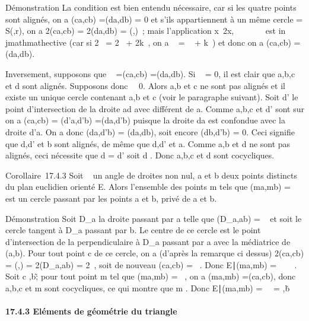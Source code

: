 \documentclass[]{article}
\begin{document}
Démonstration La condition est bien entendu nécessaire, car si les
quatre points sont alignés, on a \widehat(ca,cb)
=\widehat (da,db) = 0 et s'ils appartiennent à un
même cercle \Gamma = S(\omega,r), on a 2\widehat(ca,cb) =
2\widehat(da,db) =\widehat
(\overrightarrow\omegaa,\overrightarrow\omegab)~;
mais l'application x\mapsto~2x, ~\diagup\pi~ \rightarrow~ ~\pi~ est
in\\jmathmathective (car si 2\alpha~ = 2\beta~ + 2k\pi~, on a \alpha~ = \beta~ + k\pi~) et donc on a
\widehat(ca,cb) =\widehat (da,db).

Inversement, supposons que \alpha~ =\widehat (ca,cb)
=\widehat (da,db). Si \alpha~ = 0, il est clair que a,b,c
et d sont alignés. Supposons donc \alpha~\neq~0. Alors
a,b et c ne sont pas alignés et il existe un unique cercle \Gamma contenant
a,b et c (voir le paragraphe suivant). Soit d' le point d'intersection
de la droite ad avec \Gamma différent de a. Comme a,b,c et d' sont sur \Gamma on a
\widehat(ca,cb) =\widehat
(d'a,d'b) =\widehat (da,d'b) puisque la droite da
est confondue avec la droite d'a. On a donc
\widehat(da,d'b) =\widehat
(da,db), soit encore \widehat(db,d'b) = 0. Ceci
signifie que d,d' et b sont alignés, de même que d,d' et a. Comme a,b et
d ne sont pas alignés, ceci nécessite que d = d' soit d \in \Gamma. Donc a,b,c
et d sont cocycliques.

Corollaire~17.4.3 Soit \alpha~ un angle de droites non nul, a et b deux points
distincts du plan euclidien orienté E. Alors l'ensemble des points m
tels que \widehat(ma,mb) = \alpha~ est un cercle passant
par les points a et b, privé de a et b.

Démonstration Soit D_a la droite passant par a telle que
\widehat(D_a,ab) = \alpha~ et soit \Gamma le cercle
tangent à D_a passant par b. Le centre \omega de ce cercle est le
point d'intersection de la perpendiculaire à D_a passant par a
avec la médiatrice de (a,b). Pour tout point c de ce cercle, on a
(d'après la remarque ci dessus) 2\widehat(ca,cb)
=\widehat
(\overrightarrow\omegaa,\overrightarrow\omegab)
= 2\widehat(D_a,ab) = 2\alpha~, soit de nouveau
\widehat(ca,cb) = \alpha~. Donc \m \in
E∣\widehat(ma,mb) =
\alpha~\ \subset~ \Gamma. Soit c \in \Gamma
\diagdown\a,b\~; pour tout point m tel que
\widehat(ma,mb) = \alpha~, on a
\widehat(ma,mb) =\widehat (ca,cb),
donc a,b,c et m sont cocycliques, ce qui montre que m \in \Gamma. Donc
\m \in
E∣\widehat(ma,mb) =
\alpha~\ = \Gamma \diagdown\a,b\.

\paragraph{17.4.3 Eléments de géométrie du triangle}
\end{document}
